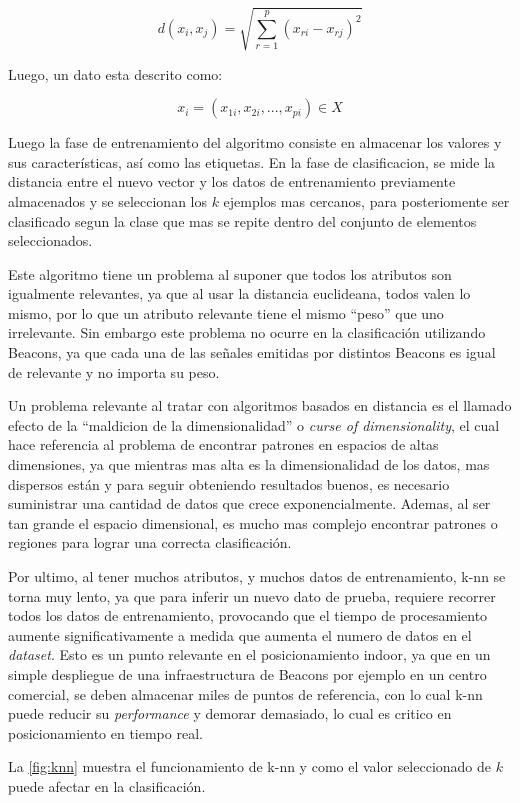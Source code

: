 \[ d(x_{i}, x_{j}) = \sqrt{\sum_{r=1}^{p}(x_{ri} -x_{rj})^{2}} \]

Luego, un dato esta descrito como:

$$ x_{i} = (x_{1i}, x_{2i}, ..., x_{pi}) \in X$$

Luego la fase de entrenamiento del algoritmo consiste en almacenar los valores y sus características, así como las etiquetas. En la fase de clasificacion, se mide la distancia entre el nuevo vector y los datos de entrenamiento previamente almacenados y se seleccionan los $k$ ejemplos mas cercanos, para posteriomente ser clasificado segun la clase que mas se repite dentro del conjunto de elementos seleccionados.

Este algoritmo tiene un problema al suponer que todos los atributos son igualmente relevantes, ya que al usar la distancia euclideana, todos valen lo mismo, por lo que un atributo relevante tiene el mismo ``peso'' que uno irrelevante. Sin embargo este problema no ocurre en la clasificación utilizando Beacons, ya que cada una de las señales emitidas por distintos Beacons es igual de relevante y no importa su peso.

Un problema relevante al tratar con algoritmos basados en distancia es el llamado efecto de la ``maldicion de la dimensionalidad'' o \textit{curse of dimensionality}, el cual hace referencia al problema de encontrar patrones en espacios de altas dimensiones, ya que mientras mas alta es la dimensionalidad de los datos, mas dispersos están y para seguir obteniendo resultados buenos, es necesario suministrar una cantidad de datos que crece exponencialmente. Ademas, al ser tan grande el espacio dimensional, es mucho mas complejo encontrar patrones o regiones para lograr una correcta clasificación.

Por ultimo, al tener muchos atributos, y muchos datos de entrenamiento, k-nn se torna muy lento, ya que para inferir un nuevo dato de prueba, requiere recorrer todos los datos de entrenamiento, provocando que el tiempo de procesamiento aumente significativamente a medida que aumenta el numero de datos en el \textit{dataset}. Esto es un punto relevante en el posicionamiento indoor, ya que en un simple despliegue de una infraestructura de Beacons por ejemplo en un centro comercial, se deben almacenar miles de puntos de referencia, con lo cual k-nn puede reducir su \textit{performance} y demorar demasiado, lo cual es critico en posicionamiento en tiempo real.

La \autoref{fig:knn} muestra el funcionamiento de k-nn y como el valor seleccionado de $k$ puede afectar en la clasificación.


